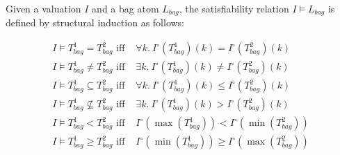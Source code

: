 Given a valuation $I$ and a bag atom $L_{bag}$, the satisfiability relation $I \models L_{bag}$ is defined by structural induction as follows:
\begin{small}
\begin{align*}
I \models T^1_{bag} = T^2_{bag} \mbox{ iff }& \forall k.~I^\circ(T^1_{bag})(k) = I^\circ(T^2_{bag})(k) \\
I \models T^1_{bag} \neq T^2_{bag} \mbox{ iff }& \exists k.~I^\circ(T^1_{bag})(k) \neq I^\circ(T^2_{bag})(k) \\
I \models T^1_{bag} \subseteq T^2_{bag} \mbox{ iff }& \forall k.~I^\circ(T^1_{bag})(k) \leq I^\circ(T^2_{bag})(k) \\
I \models T^1_{bag} \nsubseteq T^2_{bag} \mbox{ iff }& \exists k.~I^\circ(T^1_{bag})(k) > I^\circ(T^2_{bag})(k) \\
I \models T^1_{bag} < T^2_{bag} \mbox{ iff }& I^\circ(\max(T^1_{bag})) < I^\circ(\min(T^2_{bag})) \\
I \models T^1_{bag} \ge T^2_{bag} \mbox{ iff }& I^\circ(\min(T^1_{bag})) \ge I^\circ(\max(T^2_{bag}))
\end{align*}
\end{small}

